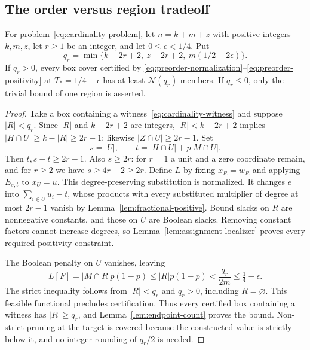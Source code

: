 \subsection{The order versus region tradeoff}
\begin{theorem}
\label{thm:preordering-cover}
For problem~\eqref{eq:cardinality-problem}, let
$n=k+m+z$ with positive integers $k,m,z$, let $r\ge1$ be an integer,
and let $0\le\epsilon<1/4$. Put
\begin{equation}\label{eq:qr}
 q_r=\min\{k-2r+2,\ z-2r+2,\ m(1/2-2\epsilon)\}.
\end{equation}
If $q_r>0$, every box cover certified by
\eqref{eq:preorder-normalization}--\eqref{eq:preorder-positivity} at
$T_*=1/4-\epsilon$ has at least $\mathcal N(q_r)$ members.
If $q_r\le0$, only the trivial bound of one region is asserted.
\end{theorem}
\begin{proof}
Take a box containing a witness~\eqref{eq:cardinality-witness} and
suppose $|R|<q_r$. Since $|R|$ and $k-2r+2$ are integers,
$|R|<k-2r+2$ implies $|H\cap U|\ge k-|R|\ge2r-1$;
likewise $|Z\cap U|\ge2r-1$. Set
\[
 s=|U|,\qquad t=|H\cap U|+p|M\cap U|.
\]
Then $t,s-t\ge2r-1$. Also $s\ge2r$: for $r=1$ a unit and a zero
coordinate remain, and for $r\ge2$ we have $s\ge4r-2\ge2r$.
Define $L$ by fixing $x_R=w_R$ and applying $E_{s,t}$ to $x_U=u$.
This degree-preserving substitution is normalized. It changes $e$ into
$\sum_{i\in U}u_i-t$, whose products with every substituted multiplier
of degree at most $2r-1$ vanish by
Lemma~\ref{lem:fractional-positive}. Bound slacks on $R$ are
nonnegative constants, and those on $U$ are Boolean slacks. Removing
constant factors cannot increase degrees, so
Lemma~\ref{lem:assignment-localizer} proves every required positivity
constraint.

The Boolean penalty on $U$ vanishes, leaving
\begin{equation}\label{eq:restricted-penalty}
 L[F]=|M\cap R|p(1-p)\le |R|p(1-p)
 <\frac{q_r}{2m}\le\tfrac14-\epsilon.
\end{equation}
The strict inequality follows from $|R|<q_r$ and $q_r>0$, including
$R=\varnothing$. This feasible functional precludes certification.
Thus every certified box containing a witness has $|R|\ge q_r$,
and Lemma~\ref{lem:endpoint-count} proves the bound. Non-strict pruning
at the target is covered because the constructed value is strictly below
it, and no integer rounding of $q_r/2$ is needed.
\end{proof}

